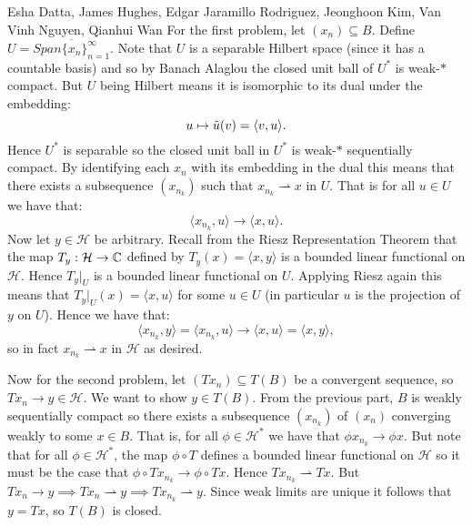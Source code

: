

\begin{solution}{Esha Datta, James Hughes, Edgar Jaramillo Rodriguez, Jeonghoon Kim, Van Vinh Nguyen, Qianhui Wan}
        For the first problem, let $(x_n) \subseteq B$.
        Define $U = \overline{Span\{x_n\}_{n=1}^\infty}$.
        Note that $U$ is a separable Hilbert space (since it has a countable basis) and so by Banach Alaglou the closed unit ball of $U^*$ is weak-$*$ compact.
        But $U$ being Hilbert means it is isomorphic to its dual under the embedding: 
        \[ u \mapsto \Tilde{u}(v) = \langle v,u \rangle. \]
        Hence $U^*$ is separable so the closed unit ball in $U^*$ is weak-$*$ sequentially compact.
        By identifying each $x_n$ with its embedding in the dual this means that there exists a subsequence $(x_{n_k})$ such that $x_{n_k} \rightharpoonup x$ in $U$.
        That is for all $u \in U$ we have that:
        \[ \langle x_{n_k}, u \rangle \to \langle x, u \rangle. \]
        Now let $y\in \mathcal{H}$ be arbitrary. Recall from the Riesz Representation Theorem that the map $T_y: \mathcal{H} \to \mathbb{C}$ defined by $T_y(x) = \langle x, y \rangle$ is a bounded linear functional on $\mathcal{H}$.
        Hence $T_y|_{U}$ is a bounded linear functional on $U$.
        Applying Riesz again this means that  $T_y|_{U}(x) = \langle x, u\rangle$ for some $u\in U$ (in particular $u$ is the projection of $y$ on $U$).
        Hence we have that:
        \[ \langle x_{n_k}, y \rangle =\langle x_{n_k}, u \rangle \to \langle x, u \rangle  = \langle x, y \rangle, \]
        so in fact $x_{n_k}\rightharpoonup x$ in $\mathcal{H}$ as desired. 

        Now for the second problem, let $(Tx_n)\subseteq T(B)$ be a convergent sequence, so $Tx_n \to y \in \mathcal{H}$.
        We want to show $y\in T(B)$.
        From the previous part, $B$ is weakly sequentially compact so there exists a subsequence $(x_{n_k})$ of $(x_n)$ converging weakly to some $x\in B$.
        That is, for all $\phi \in \mathcal{H}^*$ we have that $\phi x_{n_k} \to \phi x$.
        But note that for all $\phi \in \mathcal{H}^*$, the map $\phi \circ T$ defines a bounded linear functional on $\mathcal{H}$ so it must be the case that $\phi \circ Tx_{n_k} \to \phi \circ Tx$.
        Hence $Tx_{n_k} \rightharpoonup Tx$.
        But $Tx_n \to y \implies Tx_n \rightharpoonup y \implies Tx_{n_k} \rightharpoonup y$.
        Since weak limits are unique it follows that $y = Tx$, so $T(B)$ is closed.
\end{solution}

